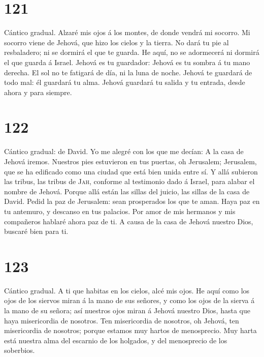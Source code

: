\hypertarget{section-120}{%
\section{121}\label{section-120}}

 Cántico gradual. Alzaré mis ojos á los montes, de donde
vendrá mi socorro.  Mi socorro viene de Jehová, que hizo
los cielos y la tierra.  No dará tu pie al resbaladero; ni
se dormirá el que te guarda.  He aquí, no se adormecerá ni
dormirá el que guarda á Israel.  Jehová es tu guardador:
Jehová es tu sombra á tu mano derecha.  El sol no te
fatigará de día, ni la luna de noche.  Jehová te guardará
de todo mal: él guardará tu alma.  Jehová guardará tu
salida y tu entrada, desde ahora y para siempre.

\hypertarget{section-121}{%
\section{122}\label{section-121}}

 Cántico gradual: de David. Yo me alegré con los que me
decían: A la casa de Jehová iremos.  Nuestros pies
estuvieron en tus puertas, oh Jerusalem;  Jerusalem, que
se ha edificado como una ciudad que está bien unida entre sí.
 Y allá subieron las tribus, las tribus de \textsc{Jah},
conforme al testimonio dado á Israel, para alabar el nombre de Jehová.
 Porque allá están las sillas del juicio, las sillas de la
casa de David.  Pedid la paz de Jerusalem: sean
prosperados los que te aman.  Haya paz en tu antemuro, y
descanso en tus palacios.  Por amor de mis hermanos y mis
compañeros hablaré ahora paz de ti.  A causa de la casa de
Jehová nuestro Dios, buscaré bien para ti.

\hypertarget{section-122}{%
\section{123}\label{section-122}}

 Cántico gradual. A ti que habitas en los cielos, alcé mis
ojos.  He aquí como los ojos de los siervos miran á la
mano de sus señores, y como los ojos de la sierva á la mano de su
señora; así nuestros ojos miran á Jehová nuestro Dios, hasta que haya
misericordia de nosotros.  Ten misericordia de nosotros,
oh Jehová, ten misericordia de nosotros; porque estamos muy hartos de
menosprecio.  Muy harta está nuestra alma del escarnio de
los holgados, y del menosprecio de los soberbios.

